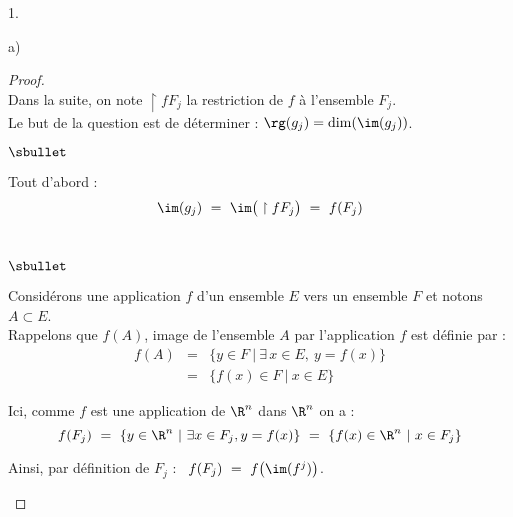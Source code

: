\begin{noliste}{1.}
\begin{noliste}{a)}
    \begin{proof}~\\%
      Dans la suite, on note $\restriction{f}{F_j}$ la restriction de
      $f$ à l'ensemble $F_j$.\\
      Le but de la question est de déterminer : $\rg(g_j) = \dim(\im(g_j))$.
      \begin{noliste}{$\sbullet$}
      \item Tout d'abord :
        \[
        \im(g_j) \ = \ \im\big( \restriction{f}{F_j} \big) \ = \
        f(F_j)
        \]~\\[-1cm]
        \begin{remarkL}{.98}%
          \begin{noliste}{$\sbullet$}
          \item Considérons une application $f$ d'un ensemble $E$ vers
            un ensemble $F$ et notons $A \subset E$.\\
            Rappelons que $f(A)$, image de l'ensemble $A$ par
            l'application $f$ est définie par :
            \[
            \begin{array}{rcl}
              f(A) & = & \{ y \in F \ | \ \exists \, x \in E, \ y = 
	      f(x) \}
              \\[.2cm]
              & = & \{ f(x) \in F \ | \ x \in E \}
            \end{array}
            \]
          \item Ici, comme $f$ est une application de $\R^n$ dans
            $\R^n$ on a :
            \[
            f(F_j) \ = \ \{ y \in \R^n \ | \ \exists x \in F_j, y =
            f(x) \} \ = \ \{ f(x) \in \R^n \ | \ x \in F_j \}
            \]
          \end{noliste}
        \end{remarkL}

      \item Ainsi, par définition de $F_j$ : \ $f(F_j) \ = \ f\big(
        \im(f^j) \big)$.        


\end{noliste}
\end{proof}
\end{noliste}
\end{noliste}
